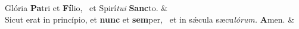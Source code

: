 Glória \textbf{Pa}\-tri et \textbf{Fí}\-lio,~\grestar{}  et Spirí\emph{\-tui }\textbf{Sanc}\-to. & \psalmusTr{} \\
Sicut erat in princípio, et \textbf{nunc} et \textbf{sem}\-per,~\grestar{}  et in sǽcula sæcu\emph{ló\-rum. }\textbf{A}\-men. & \psalmusTr{} \\
